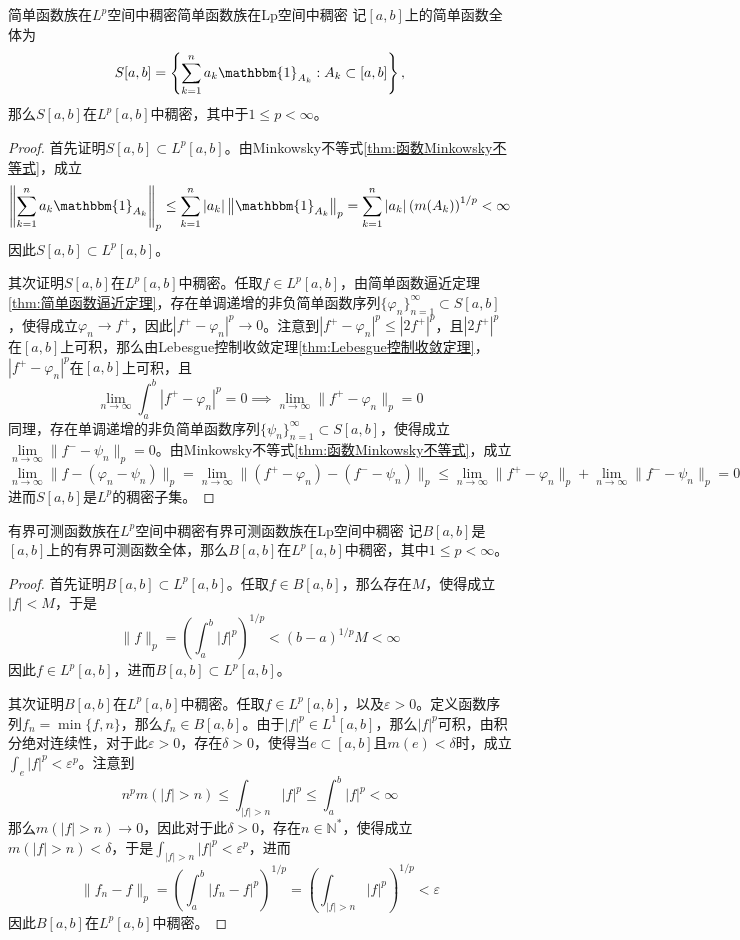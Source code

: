 \documentclass[lang = cn, scheme = chinese, thmcnt = section]{elegantbook}
\begin{document}
\begin{lemma}{简单函数族在$L^p$空间中稠密}{简单函数族在Lp空间中稠密}
	记$[a,b]$上的简单函数全体为
	$$
	S[a,b]=\left\{ \sum_{k=1}^{n}a_k\mathbbm{1}_{A_k}:A_k\subset[a,b]\right\},
	$$
	那么$S[a,b]$在$L^p[a,b]$中稠密，其中于$1\le p<\infty$。
\end{lemma}

\begin{proof}
	首先证明$S[a,b]\subset L^p[a,b]$。由Minkowsky不等式\ref{thm:函数Minkowsky不等式}，成立
	$$
	\left\| \sum_{k=1}^{n}a_k\mathbbm{1}_{A_k} \right\|_p
	\le \sum_{k=1}^{n}|a_k|\left\| \mathbbm{1}_{A_k} \right\|_p
	= \sum_{k=1}^{n}|a_k|\left(m(A_k)\right)^{1/p}
	<\infty
	$$
	因此$S[a,b]\subset L^p[a,b]$。
	
	其次证明$S[a,b]$在$L^p[a,b]$中稠密。任取$f\in L^p[a,b]$，由简单函数逼近定理\ref{thm:简单函数逼近定理}，存在单调递增的非负简单函数序列$\{ \varphi_n \}_{n=1}^{\infty}\subset S[a,b]$，使得成立$\varphi_n\to f^+$，因此$\left|f^+-\varphi_n\right|^p\to0$。注意到$\left|f^+-\varphi_n\right|^p\le \left|2f^+\right|^p$，且$\left|2f^+\right|^p$在$[a,b]$上可积，那么由Lebesgue控制收敛定理\ref{thm:Lebesgue控制收敛定理}，$\left|f^+-\varphi_n\right|^p$在$[a,b]$上可积，且
	$$
	\lim_{n\to\infty}\int_a^b \left|f^+-\varphi_n\right|^p=0
	\implies \lim_{n\to\infty}\|f^+-\varphi_n\|_p=0
	$$
	同理，存在单调递增的非负简单函数序列$\{ \psi_n \}_{n=1}^{\infty}\subset S[a,b]$，使得成立$\lim\limits_{n\to\infty}\|f^--\psi_n\|_p=0$。由Minkowsky不等式\ref{thm:函数Minkowsky不等式}，成立
	$$
	\lim_{n\to\infty}\| f-(\varphi_n-\psi_n) \|_p
	=\lim_{n\to\infty}\| (f^+-\varphi_n)-(f^--\psi_n) \|_p
	\le \lim_{n\to\infty}\|f^+-\varphi_n\|_p+\lim_{n\to\infty}\|f^--\psi_n\|_p=0
	$$
	进而$S[a,b]$是$L^p$的稠密子集。
\end{proof}

\begin{lemma}{有界可测函数族在$L^p$空间中稠密}{有界可测函数族在Lp空间中稠密}
	记$B[a,b]$是$[a,b]$上的有界可测函数全体，那么$B[a,b]$在$L^p[a,b]$中稠密，其中$1\le p<\infty$。
\end{lemma}

\begin{proof}
	首先证明$B[a,b]\subset L^p[a,b]$。任取$f\in B[a,b]$，那么存在$M$，使得成立$|f|<M$，于是
	$$
	\|f\|_p=\left(\int_a^b|f|^p\right)^{1/p}<(b-a)^{1/p}M<\infty
	$$
	因此$f\in L^p[a,b]$，进而$B[a,b]\subset L^p[a,b]$。
	
	其次证明$B[a,b]$在$L^p[a,b]$中稠密。任取$f\in L^p[a,b]$，以及$\varepsilon>0$。定义函数序列$f_n=\min\{ f,n \}$，那么$f_n\in B[a,b]$。由于$|f|^p\in L^1[a,b]$，那么$|f|^p$可积，由积分绝对连续性，对于此$\varepsilon>0$，存在$\delta>0$，使得当$e\subset [a,b]$且$m(e)<\delta$时，成立$\displaystyle \int_{e}|f|^p <\varepsilon^p$。注意到
	$$
	n^p m(|f|>n)\le \int_{|f|>n}|f|^p\le\int_a^b|f|^p<\infty
	$$
	那么$m(|f|>n)\to 0$，因此对于此$\delta>0$，存在$n\in\mathbb{N}^*$，使得成立$m(|f|>n)<\delta$，于是$\displaystyle \int_{|f|>n}|f|^p <\varepsilon^p$，进而
	$$
	\|f_n-f\|_p=\left(\int_a^b|f_n-f|^p\right)^{1/p}=\left(\int_{|f|>n}|f|^p\right)^{1/p}<\varepsilon
	$$
	因此$B[a,b]$在$L^p[a,b]$中稠密。
\end{proof}
\end{document}
